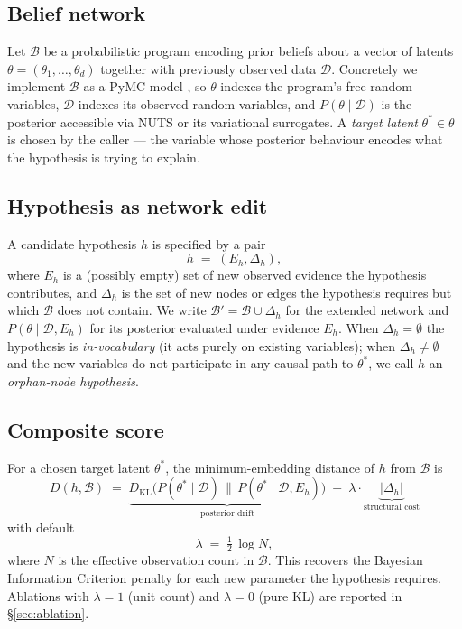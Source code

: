 \documentclass{article}
\begin{document}
\subsection{Belief network}
\label{sec:belief-network}

Let $\mathcal{B}$ be a probabilistic program encoding prior beliefs
about a vector of latents $\theta = (\theta_{1}, \ldots, \theta_{d})$
together with previously observed data $\mathcal{D}$. Concretely we
implement $\mathcal{B}$ as a PyMC model \citep{salvatier2016pymc}, so
$\theta$ indexes the program's free random variables,
$\mathcal{D}$ indexes its observed random variables, and
$P(\theta \mid \mathcal{D})$ is the posterior accessible via NUTS
\citep{hoffman2014nuts} or its variational surrogates. A \emph{target
latent} $\theta^{*} \in \theta$ is chosen by the caller --- the
variable whose posterior behaviour encodes what the hypothesis is
trying to explain.

\subsection{Hypothesis as network edit}
\label{sec:hypothesis-edit}

A candidate hypothesis $h$ is specified by a pair
\begin{equation*}
h \;=\; (E_{h}, \Delta_{h}),
\end{equation*}
where $E_{h}$ is a (possibly empty) set of new observed evidence the
hypothesis contributes, and $\Delta_{h}$ is the set of new nodes or
edges the hypothesis requires but which $\mathcal{B}$ does not
contain. We write $\mathcal{B}' = \mathcal{B} \cup \Delta_{h}$ for the
extended network and $P(\theta \mid \mathcal{D}, E_{h})$ for its
posterior evaluated under evidence $E_{h}$. When $\Delta_{h} = \emptyset$
the hypothesis is \emph{in-vocabulary} (it acts purely on existing
variables); when $\Delta_{h} \neq \emptyset$ and the new variables
do not participate in any causal path to $\theta^{*}$, we call $h$
an \emph{orphan-node hypothesis}.

\subsection{Composite score}
\label{sec:composite}

For a chosen target latent $\theta^{*}$, the minimum-embedding distance
of $h$ from $\mathcal{B}$ is
\begin{equation}
D(h, \mathcal{B}) \;=\; \underbrace{D_{\mathrm{KL}}\big(
  P(\theta^{*} \mid \mathcal{D}) \,\big\|\,
  P(\theta^{*} \mid \mathcal{D}, E_{h})\big)}_{\text{posterior drift}}
\;+\;
\lambda \cdot \underbrace{|\Delta_{h}|}_{\text{structural cost}}
\label{eq:D-expanded}
\end{equation}
with default
\begin{equation}
\lambda \;=\; \tfrac{1}{2}\,\log N,
\label{eq:BIC-lambda}
\end{equation}
where $N$ is the effective observation count in $\mathcal{B}$. This
recovers the Bayesian Information Criterion penalty
\citep{schwarz1978} for each new parameter the hypothesis requires.
Ablations with $\lambda = 1$ (unit count) and $\lambda = 0$ (pure KL)
are reported in \S\ref{sec:ablation}.
\end{document}
